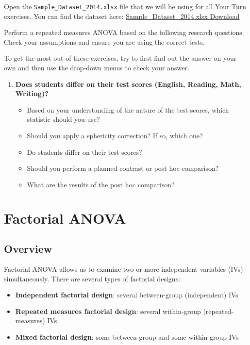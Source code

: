\documentclass[
]{book}
\providecommand{\tightlist}{%
  \setlength{\itemsep}{0pt}\setlength{\parskip}{0pt}}
\begin{document}
Open the \texttt{Sample\_Dataset\_2014.xlsx} file that we will be using for all Your Turn exercises. You can find the dataset here: \href{https://github.com/danawanzer/stats-with-jamovi/blob/master/data/Sample_Dataset_2014.xlsx}{Sample\_Dataset\_2014.xlsx Download}

Perform a repeated measures ANOVA based on the following research questions. Check your assumptions and ensure you are using the correct tests.

To get the most out of these exercises, try to first find out the answer on your own and then use the drop-down menus to check your answer.

\begin{enumerate}
\def\labelenumi{\arabic{enumi}.}
\item
  \textbf{Does students differ on their test scores (English, Reading, Math, Writing)?}

  \begin{itemize}
  \item
    Based on your understanding of the nature of the test scores, which statistic should you use?
  \item
    Should you apply a sphericity correction? If so, which one?
  \item
    Do students differ on their test scores?
  \item
    Should you perform a planned contrast or post hoc comparison?
  \item
    What are the results of the post hoc comparison?
  \end{itemize}
\end{enumerate}

\hypertarget{factorial-anova}{%
\section{Factorial ANOVA}\label{factorial-anova}}

\hypertarget{overview-8}{%
\subsection{Overview}\label{overview-8}}

Factorial ANOVA allows us to examine two or more independent variables (IVs) simultaneously. There are several types of factorial designs:

\begin{itemize}
\tightlist
\item
  \textbf{Independent factorial design}: several between-group (independent) IVs
\item
  \textbf{Repeated measures factorial design}: several within-group (repeated-measures) IVs
\item
  \textbf{Mixed factorial design}: some between-group and some within-group IVs
\end{itemize}
\end{document}
